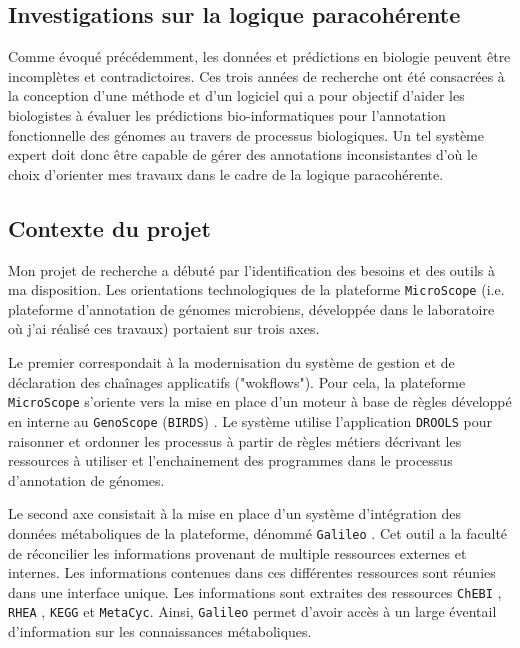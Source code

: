 \begin{refsegment}
\chapter{Investigations sur la logique paracohérente}

Comme évoqué précédemment, les données et prédictions en biologie peuvent être incomplètes et contradictoires. Ces trois années de recherche ont été consacrées à la conception d’une méthode et d'un logiciel qui a pour objectif d'aider les biologistes à évaluer les prédictions bio-informatiques pour l'annotation fonctionnelle des génomes au travers de processus biologiques. Un tel système expert doit donc être capable de gérer des annotations inconsistantes d'où le choix d'orienter mes travaux dans le cadre de la logique paracohérente.

\section{Contexte du projet}

Mon projet de recherche a débuté par l'identification des besoins et des outils à ma disposition. Les orientations technologiques de la plateforme \texttt{MicroScope} (i.e. plateforme d’annotation de génomes microbiens, développée dans le laboratoire où j’ai réalisé ces travaux) portaient sur trois axes.

Le premier correspondait à la modernisation du système de gestion et de déclaration des chaînages applicatifs ("wokflows"). Pour cela, la plateforme \texttt{MicroScope} s'oriente vers la mise en place d'un moteur à base de règles développé en interne au \texttt{GenoScope} (\texttt{\gls{BIRDS}}) . Le système utilise l'application \texttt{DROOLS}\cite{mcwhirter2001drools,browne2009jboss} pour raisonner et ordonner les processus à partir de règles métiers décrivant les ressources à utiliser et l’enchainement des programmes dans le processus d'annotation de génomes.

Le second axe consistait à la mise en place d'un système d'intégration des données métaboliques de la plateforme, dénommé \texttt{Galileo} \cite{galileo2014}. Cet outil a la faculté de réconcilier les informations provenant de multiple ressources externes et internes. Les informations contenues dans ces différentes ressources sont réunies dans une interface unique. Les informations sont extraites des ressources \texttt{ChEBI} \cite{hastings2013chebi}, \texttt{RHEA} \cite{alcantara2012rhea}, \texttt{KEGG} et \texttt{MetaCyc}. Ainsi, \texttt{Galileo} permet d'avoir accès à un large éventail d'information sur les connaissances métaboliques. 


\end{refsegment}
